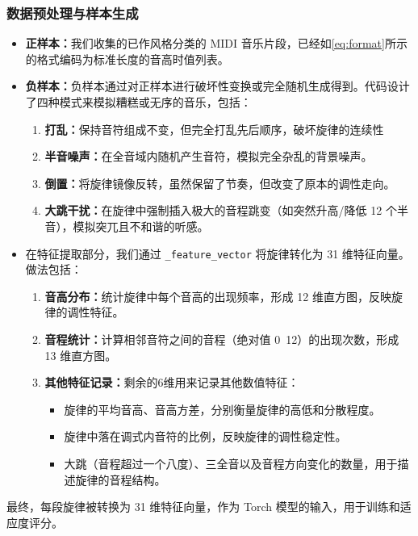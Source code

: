\documentclass[12pt, a4paper]{ctexart}
\begin{document}
\subsubsection{数据预处理与样本生成}
\begin{itemize}
    \item \textbf{正样本：}我们收集的已作风格分类的 MIDI 音乐片段，已经如\eqref{eq:format}所示的格式编码为标准长度的音高时值列表。
    \item \textbf{负样本：}负样本通过对正样本进行破坏性变换或完全随机生成得到。代码设计了四种模式来模拟糟糕或无序的音乐，包括：
        \begin{enumerate}
            \item \textbf{打乱：}保持音符组成不变，但完全打乱先后顺序，破坏旋律的连续性
            \item \textbf{半音噪声：}在全音域内随机产生音符，模拟完全杂乱的背景噪声。
            \item \textbf{倒置：}将旋律镜像反转，虽然保留了节奏，但改变了原本的调性走向。
            \item \textbf{大跳干扰：}在旋律中强制插入极大的音程跳变（如突然升高/降低 12 个半音），模拟突兀且不和谐的听感。
        \end{enumerate}
    \item 在特征提取部分，我们通过 \verb|_feature_vector| 将旋律转化为 31 维特征向量。做法包括：
        \begin{enumerate}
             \item \textbf{音高分布：}统计旋律中每个音高的出现频率，形成 12 维直方图，反映旋律的调性特征。
            \item \textbf{音程统计：}计算相邻音符之间的音程（绝对值 0~12）的出现次数，形成 13 维直方图。
            \item \textbf{其他特征记录：}剩余的6维用来记录其他数值特征：
                \begin{itemize}
                    \item 旋律的平均音高、音高方差，分别衡量旋律的高低和分散程度。
                    \item 旋律中落在调式内音符的比例，反映旋律的调性稳定性。
                    \item 大跳（音程超过一个八度）、三全音以及音程方向变化的数量，用于描述旋律的音程结构。
                \end{itemize}
        \end{enumerate}
\end{itemize}
最终，每段旋律被转换为 31 维特征向量，作为 Torch 模型的输入，用于训练和适应度评分。
\end{document}
